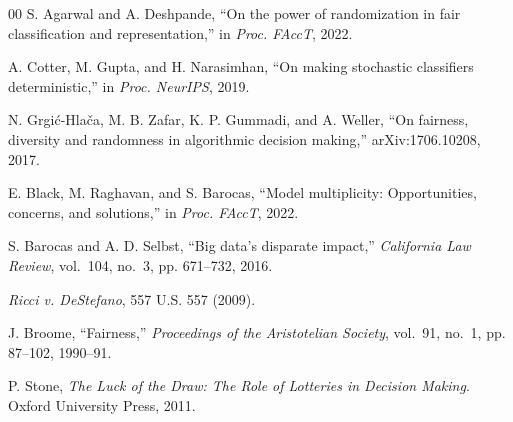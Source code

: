 \documentclass[conference]{IEEEtran}
\begin{document}
\begin{thebibliography}{00}
 S. Agarwal and A. Deshpande, ``On the power of randomization in fair
classification and representation,'' in \emph{Proc. FAccT}, 2022.

 A. Cotter, M. Gupta, and H. Narasimhan, ``On making stochastic
classifiers deterministic,'' in \emph{Proc. NeurIPS}, 2019.

 N. Grgi\'{c}-Hla\v{c}a, M. B. Zafar, K. P. Gummadi, and A. Weller,
``On fairness, diversity and randomness in algorithmic decision making,''
arXiv:1706.10208, 2017.

 E. Black, M. Raghavan, and S. Barocas, ``Model multiplicity: Opportunities,
concerns, and solutions,'' in \emph{Proc. FAccT}, 2022.

 S. Barocas and A. D. Selbst, ``Big data's disparate impact,''
\emph{California Law Review}, vol.~104, no.~3, pp. 671--732, 2016.

 \emph{Ricci v. DeStefano}, 557 U.S. 557 (2009).

 J. Broome, ``Fairness,'' \emph{Proceedings of the Aristotelian
Society}, vol.~91, no.~1, pp. 87--102, 1990--91.

 P. Stone, \emph{The Luck of the Draw: The Role of Lotteries in
Decision Making}. Oxford University Press, 2011.

\end{thebibliography}
\end{document}
